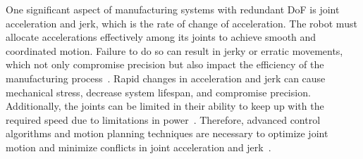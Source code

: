 









One significant aspect of manufacturing systems with redundant DoF is joint acceleration and jerk, which is the rate of change of acceleration. The robot must allocate accelerations effectively among its joints to achieve smooth and coordinated motion. Failure to do so can result in jerky or erratic movements, which not only compromise precision but also impact the efficiency of the manufacturing process~\cite{Duong.2021}. Rapid changes in acceleration and jerk can cause mechanical stress, decrease system lifespan, and compromise precision. Additionally, the joints can be limited in their ability to keep up with the required speed due to limitations in power~\cite{Staff.1988}. Therefore, advanced control algorithms and motion planning techniques are necessary to optimize joint motion and minimize conflicts in joint acceleration and jerk~\cite{Duong.2021, Valente.2017}.

